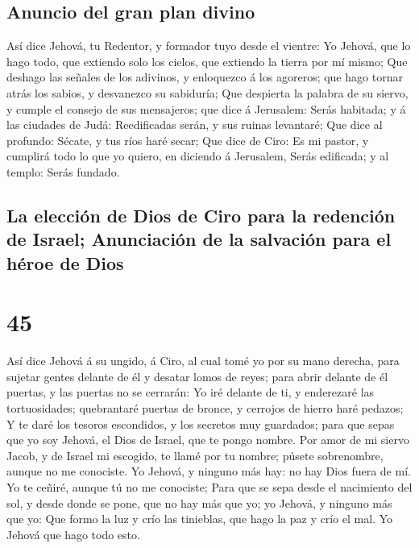 \hypertarget{anuncio-del-gran-plan-divino}{%
\subsection{Anuncio del gran plan
divino}\label{anuncio-del-gran-plan-divino}}

 Así dice Jehová, tu Redentor, y formador tuyo desde el
vientre: Yo Jehová, que lo hago todo, que extiendo solo los cielos, que
extiendo la tierra por mí mismo;  Que deshago las señales
de los adivinos, y enloquezco á los agoreros; que hago tornar atrás los
sabios, y desvanezco su sabiduría;  Que despierta la
palabra de su siervo, y cumple el consejo de sus mensajeros; que dice á
Jerusalem: Serás habitada; y á las ciudades de Judá: Reedificadas serán,
y sus ruinas levantaré;  Que dice al profundo: Sécate, y
tus ríos haré secar;  Que dice de Ciro: Es mi pastor, y
cumplirá todo lo que yo quiero, en diciendo á Jerusalem, Serás
edificada; y al templo: Serás fundado.

\hypertarget{la-elecciuxf3n-de-dios-de-ciro-para-la-redenciuxf3n-de-israel-anunciaciuxf3n-de-la-salvaciuxf3n-para-el-huxe9roe-de-dios}{%
\subsection{La elección de Dios de Ciro para la redención de Israel;
Anunciación de la salvación para el héroe de
Dios}\label{la-elecciuxf3n-de-dios-de-ciro-para-la-redenciuxf3n-de-israel-anunciaciuxf3n-de-la-salvaciuxf3n-para-el-huxe9roe-de-dios}}

\hypertarget{section-23-45}{%
\section{45}\label{section-23-45}}

 Así dice Jehová á su ungido, á Ciro, al cual tomé yo por
su mano derecha, para sujetar gentes delante de él y desatar lomos de
reyes; para abrir delante de él puertas, y las puertas no se cerrarán:
 Yo iré delante de ti, y enderezaré las tortuosidades;
quebrantaré puertas de bronce, y cerrojos de hierro haré pedazos;
 Y te daré los tesoros escondidos, y los secretos muy
guardados; para que sepas que yo soy Jehová, el Dios de Israel, que te
pongo nombre.  Por amor de mi siervo Jacob, y de Israel mi
escogido, te llamé por tu nombre; púsete sobrenombre, aunque no me
conociste.  Yo Jehová, y ninguno más hay: no hay Dios
fuera de mí. Yo te ceñiré, aunque tú no me conociste; 
Para que se sepa desde el nacimiento del sol, y desde donde se pone, que
no hay más que yo; yo Jehová, y ninguno más que yo:  Que
formo la luz y crío las tinieblas, que hago la paz y crío el mal. Yo
Jehová que hago todo esto.

